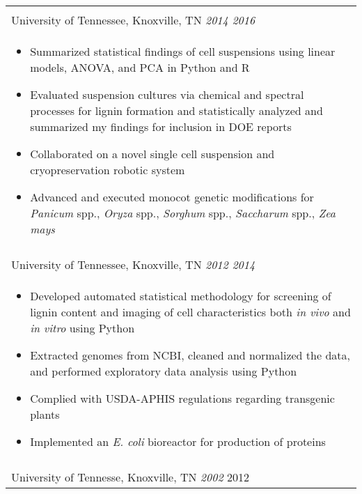 \documentclass[10pt]{article}%
\begin{document}
\begin{tabularx}{\linewidth}{M}
        \\
       University of Tennessee, Knoxville, TN \textit{2014 \textemdash{} 2016} \\
       \begin{itemize}[topsep=-12pt,parsep=0em]
            \setlength\itemsep{0em}
            \item Summarized statistical findings of cell suspensions using linear models, ANOVA, and PCA in Python and R %
            \item Evaluated suspension cultures via chemical and spectral processes for lignin formation and statistically analyzed and summarized my findings for inclusion in DOE reports %
            \item Collaborated on a novel single cell suspension and cryopreservation robotic system %
            \item Advanced and executed monocot genetic modifications for \textit{Panicum} spp., \textit{Oryza} spp., \textit{Sorghum} spp., \textit{Saccharum} spp., \textit{Zea mays}
         \end{itemize} \\
        \\
       University of Tennessee, Knoxville, TN \textit{2012 \textemdash{} 2014} \\
       \begin{itemize}[topsep=-12pt,parsep=0em]
            \setlength\itemsep{0em}
            \item Developed automated statistical methodology for screening of lignin content and imaging of cell characteristics both \textit{in vivo} and \textit{in vitro} using Python%
            \item Extracted genomes from NCBI, cleaned and normalized the data, and performed exploratory data analysis using Python
            \item Complied with USDA-APHIS regulations regarding transgenic plants
            \item Implemented an \textit{E. coli} bioreactor for production of proteins
         \end{itemize} \\
         \\
        University of Tennesse, Knoxville, TN \textit{2002} \textemdash{} 2012 \\

\end{tabularx}
\end{document}
